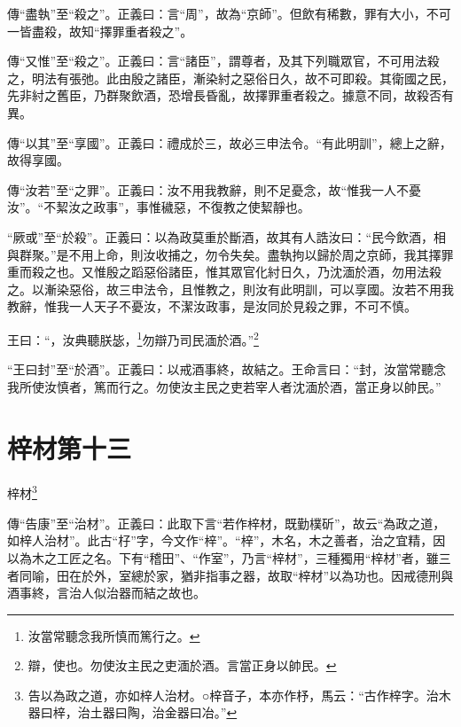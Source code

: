 {\noindent\zhuan{}\fzbyks 傳“盡執”至“殺之”。正義曰：言“周”，故為“京師”。但飲有稀數，罪有大小，不可一皆盡殺，故知“擇罪重者殺之”。 \par}

{\noindent\zhuan{}\fzbyks 傳“又惟”至“殺之”。正義曰：言“諸臣”，謂尊者，及其下列職眾官，不可用法殺之，明法有張弛。此由殷之諸臣，漸染紂之惡俗日久，故不可即殺。其衛國之民，先非紂之舊臣，乃群聚飲酒，恐增長昏亂，故擇罪重者殺之。據意不同，故殺否有異。 \par}

{\noindent\zhuan{}\fzbyks 傳“以其”至“享國”。正義曰：禮成於三，故必三申法令。“有此明訓”，總上之辭，故得享國。 \par}

{\noindent\zhuan{}\fzbyks 傳“汝若”至“之罪”。正義曰：汝不用我教辭，則不足憂念，故“惟我一人不憂汝”。“不絜汝之政事”，事惟穢惡，不復教之使絜靜也。 \par}

{\noindent\shu{}\fzkt “厥或”至“於殺”。正義曰：以為政莫重於斷酒，故其有人誥汝曰：“民今飲酒，相與群聚。”是不用上命，則汝收捕之，勿令失矣。盡執拘以歸於周之京師，我其擇罪重而殺之也。又惟殷之蹈惡俗諸臣，惟其眾官化紂日久，乃沈湎於酒，勿用法殺之。以漸染惡俗，故三申法令，且惟教之，則汝有此明訓，可以享國。汝若不用我教辭，惟我一人天子不憂汝，不潔汝政事，是汝同於見殺之罪，不可不慎。 \par}

王曰：“，汝典聽朕毖，\footnote{汝當常聽念我所慎而篤行之。}勿辯乃司民湎於酒。”\footnote{辯，使也。勿使汝主民之吏湎於酒。言當正身以帥民。}

{\noindent\shu{}\fzkt “王曰封”至“於酒”。正義曰：以戒酒事終，故結之。王命言曰：“封，汝當常聽念我所使汝慎者，篤而行之。勿使汝主民之吏若宰人者沈湎於酒，當正身以帥民。” \par}

\section{梓材第十三}


梓材\footnote{告以為政之道，亦如梓人治材。○梓音子，本亦作杼，馬云：“古作梓字。治木器曰梓，治土器曰陶，治金器曰冶。”}

{\noindent\shu{}\fzkt 傳“告康”至“治材”。正義曰：此取下言“若作梓材，既勤樸斫”，故云“為政之道，如梓人治材”。此古“杍”字，今文作“梓”。“梓”，木名，木之善者，治之宜精，因以為木之工匠之名。下有“稽田”、“作室”，乃言“梓材”，三種獨用“梓材”者，雖三者同喻，田在於外，室總於家，猶非指事之器，故取“梓材”以為功也。因戒德刑與酒事終，言治人似治器而結之故也。 \par}

